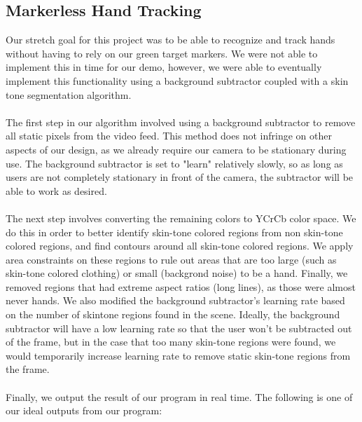 \documentclass[twoside,twocolumn]{article}
\begin{document}
\subsection{Markerless Hand Tracking}
Our stretch goal for this project was to be able to recognize and track hands without having to rely on our green target markers. We were not able to implement this in time for our demo, however, we were able to eventually implement this functionality using a background subtractor coupled with a skin tone segmentation algorithm. \\ \\
The first step in our algorithm involved using a background subtractor to remove all static pixels from the video feed. This method does not infringe on other aspects of our design, as we already require our camera to be stationary during use. The background subtractor is set to "learn" relatively slowly, so as long as users are not completely stationary in front of the camera, the subtractor will be able to work as desired. \\ \\
The next step involves converting the remaining colors to YCrCb color space. We do this in order to better identify skin-tone colored regions from non skin-tone colored regions, and find contours around all skin-tone colored regions. We apply area constraints on these regions to rule out areas that are too large (such as skin-tone colored clothing) or small (backgrond noise) to be a hand. Finally, we removed regions that had extreme aspect ratios (long lines), as those were almost never hands. We also modified the background subtractor's learning rate based on the number of skintone regions found in the scene. Ideally, the background subtractor will have a low learning rate so that the user won't be subtracted out of the frame, but in the case that too many skin-tone regions were found, we would temporarily increase learning rate to remove static skin-tone regions from the frame.\\ \\
Finally, we output the result of our program in real time. The following is one of our ideal outputs from our program:\\
\end{document}
